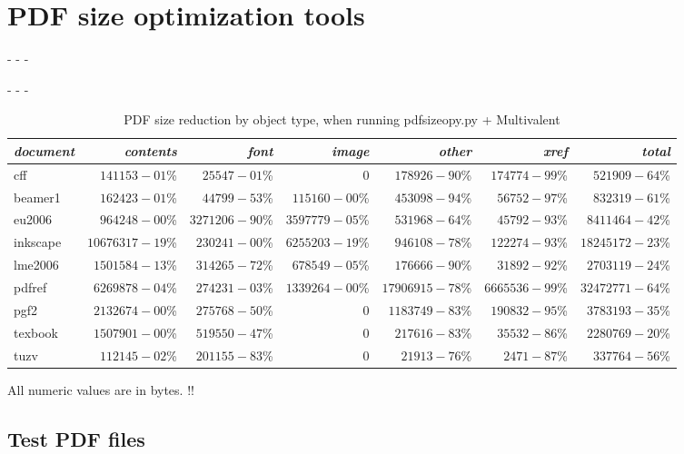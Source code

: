 \documentclass{ltugproc}
\def\cmd{\textsf}
\def\captiontop#1{%
  \advance\abovecaptionskip-\belowcaptionskip
  \advance\belowcaptionskip\abovecaptionskip
  \advance\abovecaptionskip-\belowcaptionskip
  \abovecaptionskip-\abovecaptionskip
  \caption{#1}%
  \advance\abovecaptionskip-\belowcaptionskip
  \advance\belowcaptionskip\abovecaptionskip
  \advance\abovecaptionskip-\belowcaptionskip
  \abovecaptionskip-\abovecaptionskip
}
\begin{document}
\section{PDF size optimization tools}

\begin{table*}
\captiontop{PDF size reduction by object type, when running
\cmd{pdfsizeopy.py} + Multivalent}\label{tab:psom-by-type}
\advance\tabcolsep-2pt  %
\par\small\noindent\hfil
\begin{tabular}{@{}lrrrrrr@{}}
\toprule
\emph{document} & \emph{contents} & \emph{font} & \emph{image} & \emph{other} & \emph{xref} & \emph{total} \\\midrule
cff & $141153-01$\% & $25547-01$\% & 0 & $178926-90$\% & $174774-99$\% & $521909-64$\% \\
beamer1 & $162423-01$\% & $44799-53$\% & $115160-00$\% & $453098-94$\% & $56752-97$\% & $832319-61$\% \\
eu2006 & $964248-00$\% & $3271206-90$\% & $3597779-05$\% & $531968-64$\% & $45792-93$\% & $8411464-42$\% \\
inkscape & $10676317-19$\% & $230241-00$\% & $6255203-19$\% & $946108-78$\% & $122274-93$\% & $18245172-23$\% \\
lme2006 & $1501584-13$\% & $314265-72$\% & $678549-05$\% & $176666-90$\% & $31892-92$\% & $2703119-24$\% \\
pdfref & $6269878-04$\% & $274231-03$\% & $1339264-00$\% & $17906915-78$\% & $6665536-99$\% & $32472771-64$\% \\
pgf2 & $2132674-00$\% & $275768-50$\% & 0 & $1183749-83$\% & $190832-95$\% & $3783193-35$\% \\
texbook & $1507901-00$\% & $519550-47$\% & 0 & $217616-83$\% & $35532-86$\% & $2280769-20$\% \\
tuzv & $112145-02$\% & $201155-83$\% & 0 & $21913-76$\% & $2471-87$\% & $337764-56$\% \\
\bottomrule
\end{tabular}
\par\bigskip
\par\noindent All numeric values are in bytes. !!
\end{table*}

\subsection{Test PDF files}
\end{document}
